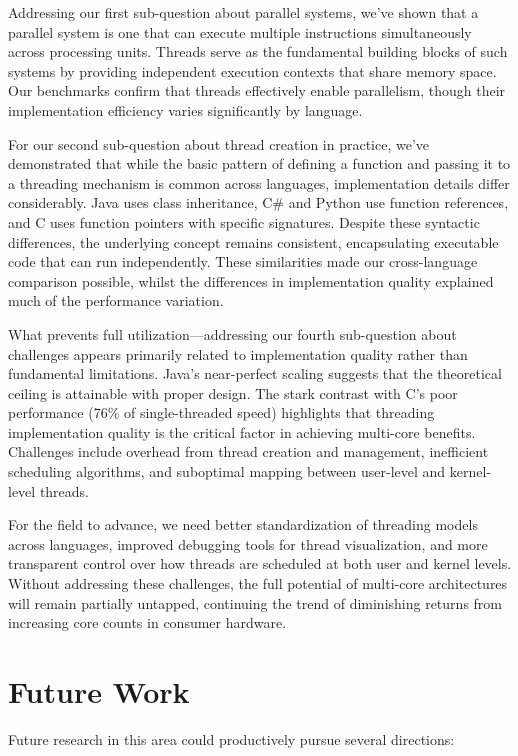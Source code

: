\documentclass[12pt,a4paper]{article}
\begin{document}
Addressing our first sub-question about parallel systems, we've shown that a parallel system is one that can execute multiple instructions simultaneously across processing units. Threads serve as the fundamental building blocks of such systems by providing independent execution contexts that share memory space. Our benchmarks confirm that threads effectively enable parallelism, though their implementation efficiency varies significantly by language.

For our second sub-question about thread creation in practice, we've demonstrated that while the basic pattern of defining a function and passing it to a threading mechanism is common across languages, implementation details differ considerably. Java uses class inheritance, C\# and Python use function references, and C uses function pointers with specific signatures. Despite these syntactic differences, the underlying concept remains consistent, encapsulating executable code that can run independently. These similarities made our cross-language comparison possible, whilst the differences in implementation quality explained much of the performance variation.

What prevents full utilization—addressing our fourth sub-question about challenges appears primarily related to implementation quality rather than fundamental limitations. Java's near-perfect scaling suggests that the theoretical ceiling is attainable with proper design. The stark contrast with C's poor performance (76\% of single-threaded speed) highlights that threading implementation quality is the critical factor in achieving multi-core benefits. Challenges include overhead from thread creation and management, inefficient scheduling algorithms, and suboptimal mapping between user-level and kernel-level threads.

For the field to advance, we need better standardization of threading models across languages, improved debugging tools for thread visualization, and more transparent control over how threads are scheduled at both user and kernel levels. Without addressing these challenges, the full potential of multi-core architectures will remain partially untapped, continuing the trend of diminishing returns from increasing core counts in consumer hardware.

\section{Future Work}

Future research in this area could productively pursue several directions:
\end{document}
